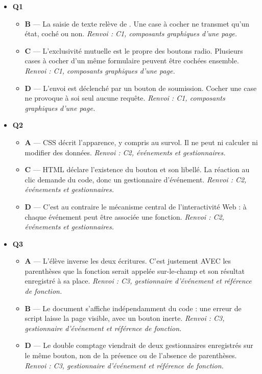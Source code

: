 \begin{itemize}
  \item \textbf{Q1}
  \begin{itemize}
    \item \textbf{B} — La saisie de texte relève de . Une case à cocher ne transmet qu'un état, coché ou non. \emph{Renvoi : C1, composants graphiques d'une page.}
    \item \textbf{C} — L'exclusivité mutuelle est le propre des boutons radio. Plusieurs cases à cocher d'un même formulaire peuvent être cochées ensemble. \emph{Renvoi : C1, composants graphiques d'une page.}
    \item \textbf{D} — L'envoi est déclenché par un bouton de soumission. Cocher une case ne provoque à soi seul aucune requête. \emph{Renvoi : C1, composants graphiques d'une page.}
  \end{itemize}
  \item \textbf{Q2}
  \begin{itemize}
    \item \textbf{A} — CSS décrit l'apparence, y compris au survol. Il ne peut ni calculer ni modifier des données. \emph{Renvoi : C2, événements et gestionnaires.}
    \item \textbf{C} — HTML déclare l'existence du bouton et son libellé. La réaction au clic demande du code, donc un gestionnaire d'événement. \emph{Renvoi : C2, événements et gestionnaires.}
    \item \textbf{D} — C'est au contraire le mécanisme central de l'interactivité Web : à chaque événement peut être associée une fonction. \emph{Renvoi : C2, événements et gestionnaires.}
  \end{itemize}
  \item \textbf{Q3}
  \begin{itemize}
    \item \textbf{A} — L'élève inverse les deux écritures. C'est justement AVEC les parenthèses que la fonction serait appelée sur-le-champ et son résultat enregistré à sa place. \emph{Renvoi : C3, gestionnaire d'événement et référence de fonction.}
    \item \textbf{B} — Le document s'affiche indépendamment du code : une erreur de script laisse la page visible, avec un bouton inerte. \emph{Renvoi : C3, gestionnaire d'événement et référence de fonction.}
    \item \textbf{D} — Le double comptage viendrait de deux gestionnaires enregistrés sur le même bouton, non de la présence ou de l'absence de parenthèses. \emph{Renvoi : C3, gestionnaire d'événement et référence de fonction.}

\end{itemize}
\end{itemize}
